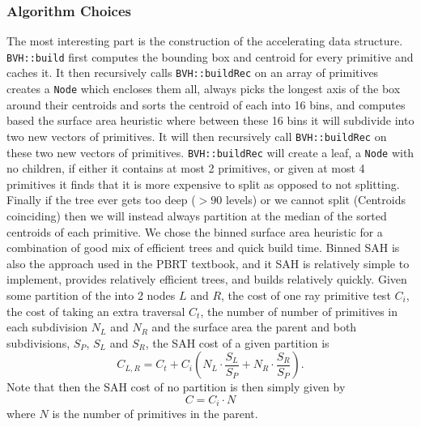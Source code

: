 \documentclass{article}
\begin{document}
\subsubsection{Algorithm Choices}
The most interesting part is the construction of the accelerating data structure. \verb|BVH::build| first computes the bounding box and centroid for every primitive and caches it. It then recursively calls \verb|BVH::buildRec| on an array of primitives creates a \verb|Node| which encloses them all, always picks the longest axis of the box around their centroids and sorts the centroid of each into 16 bins, and computes based the surface area heuristic where between these 16 bins it will subdivide into two new vectors of primitives. It will then recursively call \verb|BVH::buildRec| on these two new vectors of primitives.
\verb|BVH::buildRec| will create a leaf, a \verb|Node| with no children, if either it contains at most 2 primitives, or given at most 4 primitives it finds that it is more expensive to split as opposed to not splitting. Finally if the tree ever gets too deep ($> 90$ levels) or we cannot split (Centroids coinciding) then we will instead always partition at the median of the sorted centroids of each primitive.
We chose the binned surface area heuristic for a combination of good mix of efficient trees and quick build time. Binned SAH is also the approach used in the PBRT textbook, and it SAH is relatively simple to implement, provides relatively efficient trees, and builds relatively quickly.
Given some partition of the into 2 nodes $L$ and $R$, the cost of one ray primitive test $C_i$, the cost of taking an extra traversal $C_t$, the number of number of primitives in each subdivision $N_L$ and $N_R$ and the surface area the parent and both subdivisions, $S_P$, $S_L$ and $S_R$, the SAH cost of a given partition is
\[
    C_{L,R} = C_t + C_i\left(N_L \cdot \frac{S_L}{S_P} + N_R \cdot \frac{S_R}{S_P}\right).
\]
Note that then the SAH cost of no partition is then simply given by
\[
    C = C_i \cdot N
\]
where $N$ is the number of primitives in the parent.
\end{document}
